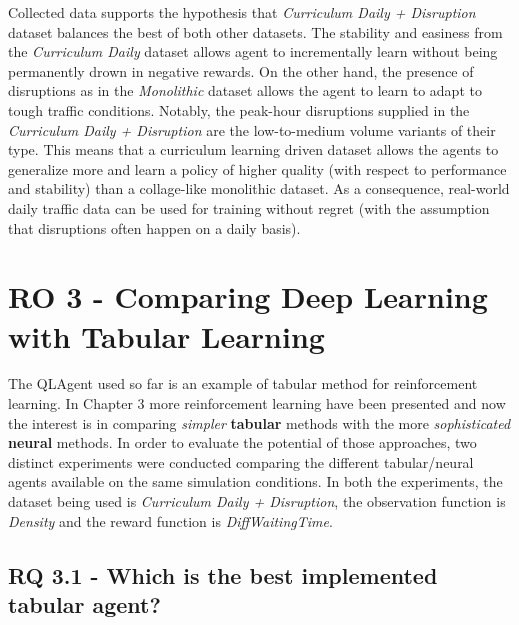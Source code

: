 Collected data supports the hypothesis that \textit{Curriculum Daily + Disruption} dataset balances the best of both other datasets.
The stability and easiness from the \textit{Curriculum Daily} dataset allows agent to incrementally learn without being permanently drown in negative rewards.
On the other hand, the presence of disruptions as in the \textit{Monolithic} dataset allows the agent to learn to adapt to tough traffic conditions.
Notably, the peak-hour disruptions supplied in the \textit{Curriculum Daily + Disruption} are the low-to-medium volume variants of their type.
This means that a curriculum learning driven dataset allows the agents to generalize more and learn a policy of higher quality (with respect to performance and stability) than a collage-like monolithic dataset.
As a consequence, real-world daily traffic data can be used for training without regret (with the assumption that disruptions often happen on a daily basis).



\section{RO 3 - Comparing Deep Learning with Tabular Learning}

The QLAgent used so far is an example of tabular method for reinforcement learning.
In Chapter 3 more reinforcement learning have been presented and now the interest is in comparing \textit{simpler} \textbf{tabular} methods with the more \textit{sophisticated} \textbf{neural} methods.
In order to evaluate the potential of those approaches, two distinct experiments were conducted comparing the different tabular/neural agents available on the same simulation conditions.
In both the experiments, the dataset being used is \textit{Curriculum Daily + Disruption}, the observation function is \textit{Density} and the reward function is \textit{DiffWaitingTime}.

\subsection{RQ 3.1 - Which is the best implemented tabular agent?}

